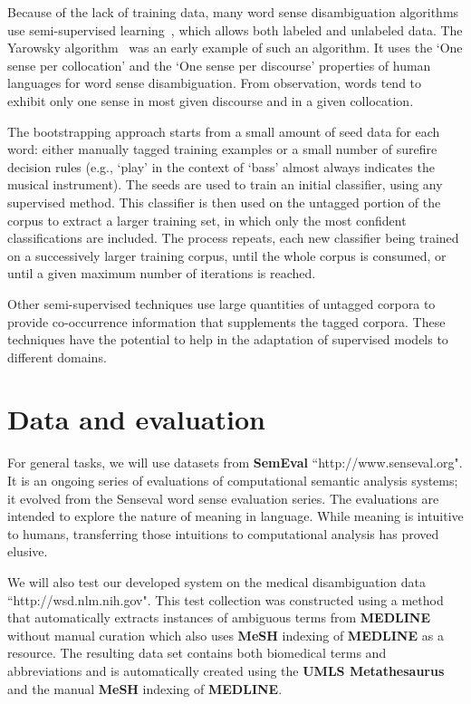 \documentclass[11pt,letterpaper]{article}
\begin{document}
Because of the lack of training data, many word sense disambiguation algorithms use semi-supervised learning~\cite{le2008semi}, which allows both labeled and unlabeled data. The Yarowsky algorithm~\cite{yarowsky1995unsupervised} was an early example of such an algorithm. It uses the `One sense per collocation' and the `One sense per discourse' properties of human languages for word sense disambiguation. From observation, words tend to exhibit only one sense in most given discourse and in a given collocation.

The bootstrapping approach starts from a small amount of seed data for each word: either manually tagged training examples or a small number of surefire decision rules (e.g., `play' in the context of `bass' almost always indicates the musical instrument). The seeds are used to train an initial classifier, using any supervised method. This classifier is then used on the untagged portion of the corpus to extract a larger training set, in which only the most confident classifications are included. The process repeats, each new classifier being trained on a successively larger training corpus, until the whole corpus is consumed, or until a given maximum number of iterations is reached.

Other semi-supervised techniques use large quantities of untagged corpora to provide co-occurrence information that supplements the tagged corpora. These techniques have the potential to help in the adaptation of supervised models to different domains.

\section*{Data and evaluation}
For general tasks, we will use datasets from \textbf{SemEval} ``http://www.senseval.org". It is an ongoing series of evaluations of computational semantic analysis systems; it evolved from the Senseval word sense evaluation series. The evaluations are intended to explore the nature of meaning in language. While meaning is intuitive to humans, transferring those intuitions to computational analysis has proved elusive.

We will also test our developed system on the medical disambiguation data ``http://wsd.nlm.nih.gov". This test collection was constructed using a method that automatically extracts instances of ambiguous terms from \textbf{MEDLINE} without manual curation which also uses \textbf{MeSH} indexing of \textbf{MEDLINE} as a resource. The resulting data set contains both biomedical terms and abbreviations and is automatically created using the \textbf{UMLS Metathesaurus} and the manual \textbf{MeSH} indexing of \textbf{MEDLINE}. 
\end{document}
